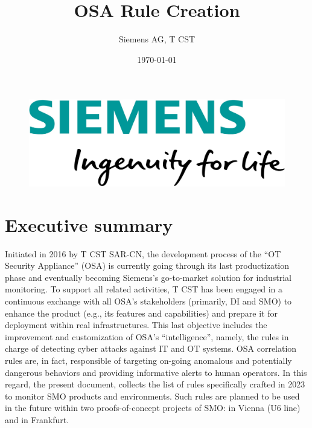 \documentclass[a4paper]{report}
\title{OSA Rule Creation}
\date{\today}
\author{Siemens AG, T CST}
\makeatletter
\renewcommand{\maketitle}{\bgroup\setlength{\parindent}{0pt}

   \begingroup\centering

  {\Huge\textbf{\@title}} \vspace{2ex}

  {\large\@author} \vspace{2ex}

  {\@date} \vspace{2ex}

   \endgroup

}
\makeatother
\begin{document}
\begin{figure}
    \begin{flushright}
        \includegraphics[scale=0.2]{images/SiemensLogo.jpg}
        \label{img:siemens_logo}
    \end{flushright}
\end{figure}

\vspace*{5cm}

\maketitle

\newpage

\section*{\center Executive summary}
\markboth{}{}

Initiated in 2016 by T CST SAR-CN, the development process of the ``OT Security Appliance'' (OSA) is currently going through its last productization phase and eventually becoming Siemens's go-to-market solution for industrial monitoring. To support all related activities, T CST has been engaged in a continuous exchange with all OSA's stakeholders (primarily, DI and SMO) to enhance the product (e.g., its features and capabilities) and prepare it for deployment within real infrastructures. This last objective includes the improvement and customization of OSA's ``intelligence'', namely, the rules in charge of detecting cyber attacks against IT and OT systems. OSA correlation rules are, in fact, responsible of targeting on-going anomalous and potentially dangerous behaviors and providing informative alerts to human operators. In this regard, the present document, collects the list of rules specifically crafted in 2023 to monitor SMO products and environments. Such rules are planned to be used in the future within two proofs-of-concept projects of SMO: in Vienna (U6 line) and in Frankfurt.

\end{document}

